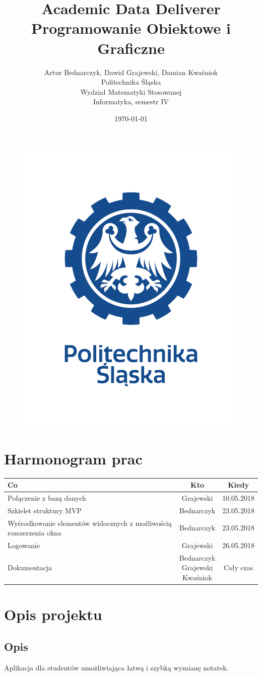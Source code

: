 \documentclass[12pt,a4paper]{article}
\title{Academic Data Deliverer\\Programowanie Obiektowe i Graficzne}
\author{Artur Bednarczyk, Dawid Grajewski, Damian Kwaśniok\\Politechnika Śląska\\Wydział Matematyki Stosowanej\\Informatyka, semestr IV}
\date{\today}
\begin{document}
	\maketitle
	\begin{figure}[H]
		\centering
		\includegraphics[width=0.5\linewidth]{LOGO2}
		\label{fig:logo}
	\end{figure}
	\clearpage
	\tableofcontents
	\clearpage
	\section{Harmonogram prac}
	\begin{tabular}{|p{}|c|c|}
	\hline
	Co & Kto & Kiedy \\	\hline\hline
	Połączenie z bazą danych & Grajewski & 10.05.2018 \\ \hline
	Szkielet struktury MVP & Bednarczyk & 23.05.2018 \\	\hline
	Wyśrodkowanie elementów widocznych z możliwością rozszerzenia okna & Bednarczyk & 23.05.2018 \\ \hline
	Logowanie & Grajewski & 26.05.2018 \\ \hline\hline
	Dokumentacja & \makecell{Bednarczyk \\Grajewski\\ Kwaśniok} & Cały czas\\ \hline
	\end{tabular}
	\clearpage
	\section{Opis projektu}
		\subsection{Opis}
			Aplikacja dla studentów umożliwiająca łatwą i szybką wymianę notatek.
\end{document}
